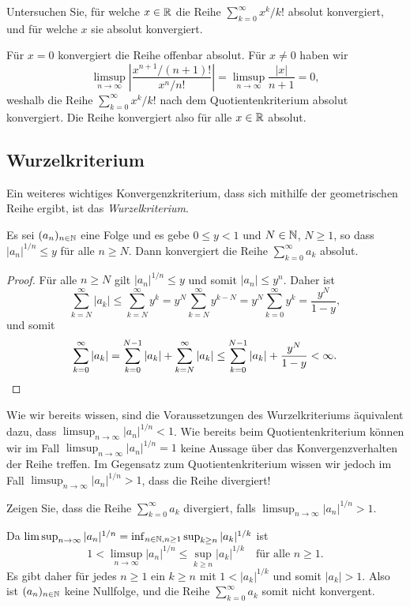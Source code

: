 \documentclass[a4paper,10pt]{article}
\begin{document}
\begin{question}
 Untersuchen Sie, für welche $x \in \mathbb{R}$ die Reihe $\sum_{k=0}^\infty x^k/k!$ absolut konvergiert, und für welche $x$ sie absolut konvergiert.
\end{question}
\begin{solution}
 Für $x = 0$ konvergiert die Reihe offenbar absolut. Für $x \neq 0$ haben wir
 \[
  \limsup_{n \to \infty} \left| \frac{x^{n+1}/(n+1)!}{x^n/n!} \right|
  = \limsup_{n \to \infty} \frac{|x|}{n+1}
  = 0,
 \]
 weshalb die Reihe $\sum_{k=0}^\infty x^k/k!$ nach dem Quotientenkriterium absolut konvergiert. Die Reihe konvergiert also für alle $x \in \mathbb{R}$ absolut.
\end{solution}





\subsection{Wurzelkriterium}

Ein weiteres wichtiges Konvergenzkriterium, dass sich mithilfe der geometrischen Reihe ergibt, ist das \emph{Wurzelkriterium}.

\begin{prop}
 Es sei $(a_n)_{n \in \mathbb{N}}$ eine Folge und es gebe $0 \leq y < 1$ und $N \in \mathbb{N}$, $N \geq 1$, so dass $|a_n|^{1/n} \leq y$ für alle $n \geq N$. Dann konvergiert die Reihe $\sum_{k=0}^\infty a_k$ absolut.
\end{prop}
\begin{proof}
 Für alle $n \geq N$ gilt $|a_n|^{1/n} \leq y$ und somit $|a_n| \leq y^n$. Daher ist
 \[
  \sum_{k=N}^\infty |a_k|
  \leq \sum_{k=N}^\infty y^k
  = y^N \sum_{k=N}^\infty y^{k-N}
  = y^N \sum_{k=0}^\infty y^k
  = \frac{y^N}{1-y},
 \]
 und somit
 \[
  \sum_{k=0}^\infty |a_k|
  = \sum_{k=0}^{N-1} |a_k| + \sum_{k=N}^\infty |a_k|
  \leq \sum_{k=0}^{N-1} |a_k| + \frac{y^N}{1-y}
  < \infty.
  \qedhere
 \]
\end{proof}

Wie wir bereits wissen, sind die Voraussetzungen des Wurzelkriteriums äquivalent dazu, dass $\limsup_{n \to \infty} |a_n|^{1/n} < 1$. Wie bereits beim Quotientenkriterium können wir im Fall $\limsup_{n \to \infty} |a_n|^{1/n} = 1$ keine Aussage über das Konvergenzverhalten der Reihe treffen. Im Gegensatz zum Quotientenkriterium wissen wir jedoch im Fall $\limsup_{n \to \infty} |a_n|^{1/n} > 1$, dass die Reihe divergiert!


\begin{question}
 Zeigen Sie, dass die Reihe $\sum_{k=0}^\infty a_k$ divergiert, falls $\limsup_{n \to \infty} |a_n|^{1/n} > 1$.
\end{question}
\begin{solution}
 Da $\limsup_{n \to \infty} |a_n|^{1/n} = \inf_{n \in \mathbb{N}, n \geq 1} \sup_{k \geq n} |a_k|^{1/k}$ ist
 \[
  1 < \limsup_{n \to \infty} |a_n|^{1/n} \leq \sup_{k \geq n} |a_k|^{1/k} \quad \text{für alle $n \geq 1$}.
 \]
 Es gibt daher für jedes $n \geq 1$ ein $k \geq n$ mit $1 < |a_k|^{1/k}$ und somit $|a_k| > 1$. Also ist $(a_n)_{n \in \mathbb{N}}$ keine Nullfolge, und die Reihe $\sum_{k=0}^\infty a_k$ somit nicht konvergent.
\end{solution}
\end{document}
